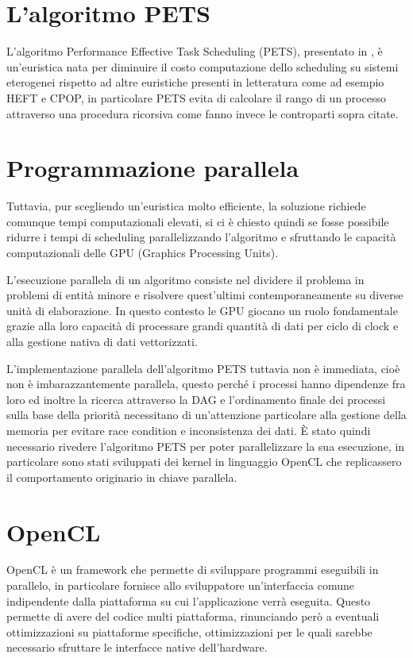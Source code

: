 
\section{L'algoritmo PETS}
L'algoritmo Performance Effective Task Scheduling (PETS), presentato in \cite{ilavarasan2007low}, è un'euristica nata per diminuire il costo computazione dello scheduling su sistemi eterogenei rispetto ad altre euristiche presenti in letteratura come ad esempio HEFT\cite{993206} e CPOP\cite{993206}, in particolare PETS evita di calcolare il rango di un processo attraverso una procedura ricorsiva come fanno invece le controparti sopra citate.

\section{Programmazione parallela}
Tuttavia, pur scegliendo un'euristica molto efficiente, la soluzione richiede comunque tempi computazionali elevati, si ci è chiesto quindi se fosse possibile ridurre i tempi di scheduling parallelizzando l'algoritmo e sfruttando le capacità computazionali delle GPU (Graphics Processing Units).

L'esecuzione parallela di un algoritmo consiste nel dividere il problema in problemi di entità minore e risolvere quest'ultimi contemporaneamente su diverse unità di elaborazione. In questo contesto le GPU giocano un ruolo fondamentale grazie alla loro capacità di processare grandi quantità di dati per ciclo di clock e alla gestione nativa di dati vettorizzati.

L'implementazione parallela dell'algoritmo PETS\cite{ilavarasan2007low} tuttavia non è immediata, cioè non è imbarazzantemente parallela, questo perché i processi hanno dipendenze fra loro ed inoltre la ricerca attraverso la DAG e l'ordinamento finale dei processi sulla base della priorità necessitano di un'attenzione particolare alla gestione della memoria per evitare race condition e inconsistenza dei dati.
È stato quindi necessario rivedere l'algoritmo PETS per poter parallelizzare la sua esecuzione, in particolare sono stati sviluppati dei kernel in linguaggio OpenCL che replicassero il comportamento originario in chiave parallela.

\section{OpenCL}
OpenCL è un framework che permette di sviluppare programmi eseguibili in parallelo, in particolare fornisce allo sviluppatore un'interfaccia comune indipendente dalla piattaforma su cui l'applicazione verrà eseguita.
Questo permette di avere del codice multi piattaforma, rinunciando però a eventuali ottimizzazioni su piattaforme specifiche, ottimizzazioni per le quali sarebbe necessario sfruttare le interfacce native dell'hardware.



